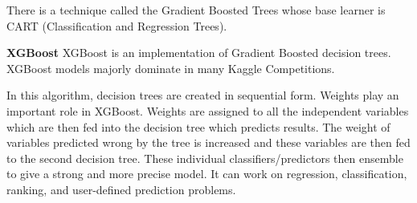 \documentclass[12pt]{article}
\begin{document}
There is a technique called the Gradient Boosted Trees whose base learner is CART (Classification and Regression Trees).

\textbf{XGBoost }
XGBoost is an implementation of Gradient Boosted decision trees. XGBoost models majorly dominate in many Kaggle Competitions.

In this algorithm, decision trees are created in sequential form. Weights play an important role in XGBoost. Weights are assigned to all the independent variables which are then fed into the decision tree which predicts results. The weight of variables predicted wrong by the tree is increased and these variables are then fed to the second decision tree. These individual classifiers/predictors then ensemble to give a strong and more precise model. It can work on regression, classification, ranking, and user-defined prediction problems.
\end{document}

